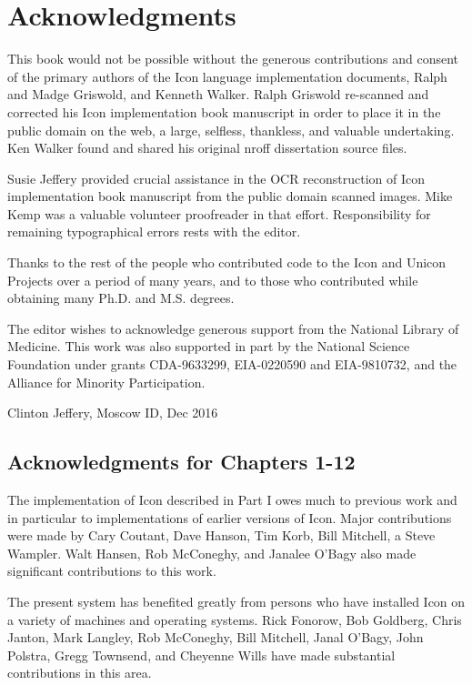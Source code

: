 \section*{Acknowledgments}

This book would not be possible without the generous contributions and
consent of the primary authors of the Icon language implementation
documents, Ralph and Madge Griswold, and Kenneth Walker. Ralph
Griswold re-scanned and corrected his Icon implementation book
manuscript in order to place it in the public domain on the web, a
large, selfless, thankless, and valuable undertaking. Ken Walker found
and shared his original nroff dissertation source files.

Susie Jeffery provided crucial assistance in the OCR reconstruction of
Icon implementation book manuscript from the public domain scanned
images. Mike Kemp was a valuable volunteer proofreader in that
effort. Responsibility for remaining typographical errors rests with
the editor.

Thanks to the rest of the people who contributed code to the Icon and
Unicon Projects over a period of many years, and to those who
contributed while obtaining many Ph.D. and M.S. degrees.

The editor wishes to acknowledge generous support from the National
Library of Medicine. This work was also supported in part by the
National Science Foundation under grants CDA-9633299, EIA-0220590
and EIA-9810732, and the Alliance for Minority Participation.

Clinton Jeffery, Moscow ID, Dec 2016

\subsection*{Acknowledgments for Chapters 1-12}

The implementation of Icon described in Part I owes much to previous
work and in particular to implementations of earlier versions of
Icon. Major contributions were made by Cary Coutant, Dave Hanson, Tim
Korb, Bill Mitchell, a Steve Wampler. Walt Hansen, Rob McConeghy, and
Janalee O'Bagy also made significant contributions to this work.

The present system has benefited greatly from persons who have
installed Icon on a variety of machines and operating systems. Rick
Fonorow, Bob Goldberg, Chris Janton, Mark Langley, Rob McConeghy, Bill
Mitchell, Janal O'Bagy, John Polstra, Gregg Townsend, and Cheyenne
Wills have made substantial contributions in this area.

